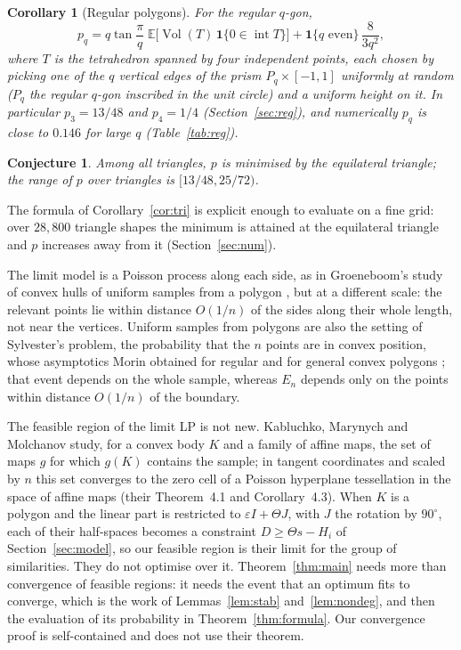 \documentclass[11pt]{amsart}
\newtheorem{corollary}[theorem]{Corollary}
\newtheorem{conjecture}[theorem]{Conjecture}
\theoremstyle{remark}\newtheorem{remark}[theorem]{Remark}
\newcommand{\E}{\mathbb{E}}
\DeclareMathOperator{\Vol}{Vol}
\begin{document}
\begin{corollary}[Regular polygons]\label{cor:reg}
For the regular $q$-gon,
\[
p_q=q\tan\frac{\pi}{q}\;\E\big[\Vol(T)\,\mathbf 1\{0\in\operatorname{int}T\}\big]+\mathbf 1\{q\text{ even}\}\,\frac{8}{3q^2},
\]
where $T$ is the tetrahedron spanned by four independent points, each chosen by picking one of the $q$ vertical edges
of the prism $P_q\times[-1,1]$ uniformly at random ($P_q$ the regular $q$-gon inscribed in the unit circle) and a
uniform height on it. In particular $p_3=13/48$ and $p_4=1/4$ (Section~\ref{sec:reg}), and numerically $p_q$ is
close to $0.146$ for large $q$ (Table~\ref{tab:reg}).
\end{corollary}

\begin{conjecture}\label{conj:eq}
Among all triangles, $p$ is minimised by the equilateral triangle; the range of $p$ over triangles is $[13/48,25/72)$.
\end{conjecture}

The formula of Corollary~\ref{cor:tri} is explicit enough to evaluate on a fine grid: over $28{,}800$ triangle shapes
the minimum is attained at the equilateral triangle and $p$ increases away from it (Section~\ref{sec:num}).

The limit model is a Poisson process along each side, as in Groeneboom's study of convex hulls of uniform samples
from a polygon \cite{groeneboom88,groeneboom12}, but at a different scale: the relevant points lie within distance
$O(1/n)$ of the sides along their whole length, not near the vertices. Uniform samples from polygons are also the
setting of Sylvester's problem, the probability that the $n$ points are in convex position, whose asymptotics Morin
obtained for regular \cite{morin25} and for general convex polygons \cite{morin26}; that event depends on the whole
sample, whereas $E_n$ depends only on the points within distance $O(1/n)$ of the boundary.

The feasible region of the limit LP is not new. Kabluchko, Marynych and Molchanov \cite{kmm} study, for a convex
body $K$ and a family of affine maps, the set of maps $g$ for which $g(K)$ contains the sample; in tangent
coordinates and scaled by $n$ this set converges to the zero cell of a Poisson hyperplane tessellation in the space
of affine maps (their Theorem~4.1 and Corollary~4.3). When $K$ is a polygon and the linear part is restricted to
$\varepsilon I+\Theta J$, with $J$ the rotation by $90^\circ$, each of their half-spaces becomes a constraint
$D\ge\Theta s-H_i$ of Section~\ref{sec:model}, so our feasible region is their limit for the group of similarities.
They do not optimise over it. Theorem~\ref{thm:main} needs more than convergence of feasible regions: it needs the
event that an optimum fits to converge, which is the work of Lemmas~\ref{lem:stab} and~\ref{lem:nondeg}, and then
the evaluation of its probability in Theorem~\ref{thm:formula}. Our convergence proof is self-contained and does not
use their theorem.
\end{document}
